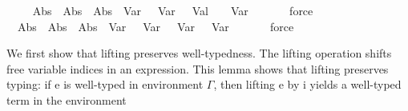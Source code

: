 \begin{isabellebody}
%
\isadelimproof
\isanewline
%
\endisadelimproof
\isanewline
\isanewline
{}\isamarkupfalse%
\ {\isachardoublequoteopen}{\isasymGamma}\ {\isasymturnstile}\isanewline
\ \ Abs\ {\isacharquery}{\kern0pt}{\isasymtau}{}\ {\isacharparenleft}{\kern0pt}Abs\ {\isacharquery}{\kern0pt}{\isasymtau}{}\ {\isacharparenleft}{\kern0pt}Abs\ {\isacharquery}{\kern0pt}{\isasymtau}{}\ {\isacharparenleft}{\kern0pt}Var\ {}\ {\isasymcdot}\ {\isacharparenleft}{\kern0pt}Var\ {}\ {\isasymcdot}\ Val\ {}\ {}\ {\isasymcdot}\ Var\ {}{\isacharparenright}{\kern0pt}{\isacharparenright}{\kern0pt}{\isacharparenright}{\kern0pt}{\isacharparenright}{\kern0pt}\ {\isacharcolon}{\kern0pt}\ {\isacharquery}{\kern0pt}{\isasymtau}{\isachardoublequoteclose}\isanewline
%
\isadelimproof
\ \ %
\endisadelimproof
%
\isatagproof
{}\isamarkupfalse%
\ force%
\endisatagproof
{\isafoldproof}%
%
\isadelimproof
\isanewline
%
\endisadelimproof
\isanewline
\isanewline
{}\isamarkupfalse%
\ {\isachardoublequoteopen}{\isasymGamma}\ {\isasymturnstile}\isanewline
\ \ Abs\ {\isacharquery}{\kern0pt}{\isasymtau}{}\ {\isacharparenleft}{\kern0pt}Abs\ {\isacharquery}{\kern0pt}{\isasymtau}{}\ {\isacharparenleft}{\kern0pt}Abs\ {\isacharquery}{\kern0pt}{\isasymtau}{}\ {\isacharparenleft}{\kern0pt}Var\ {}\ {\isasymcdot}\ Var\ {}\ {\isasymcdot}\ {\isacharparenleft}{\kern0pt}Var\ {}\ {\isasymcdot}\ Var\ {}{\isacharparenright}{\kern0pt}{\isacharparenright}{\kern0pt}{\isacharparenright}{\kern0pt}{\isacharparenright}{\kern0pt}\ {\isacharcolon}{\kern0pt}\ {\isacharquery}{\kern0pt}{\isasymtau}{\isachardoublequoteclose}\isanewline
%
\isadelimproof
\ \ %
\endisadelimproof
%
\isatagproof
{}\isamarkupfalse%
\ force%
\endisatagproof
{\isafoldproof}%
%
\isadelimproof
%
\endisadelimproof
%
\isadelimdocument
%
\endisadelimdocument
%
\isatagdocument
%
\isamarkuptrue%
%
\isamarkuptrue%
%
\endisatagdocument
{\isafolddocument}%
%
\isadelimdocument
%
\endisadelimdocument
%
\begin{isamarkuptext}%
We first show that lifting preserves well-typedness.
  The lifting operation shifts free variable indices in an expression.
  This lemma shows that lifting preserves typing:
  if e is well-typed in environment $\Gamma$,
  then lifting e by i yields a well-typed term in the environment

\end{isamarkuptext}
\end{isabellebody}
